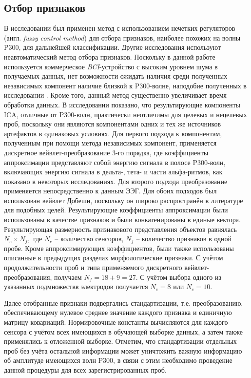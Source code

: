 \documentclass[12pt,a4paper,oneside,fleqn,leqno]{article}
\begin{document}
	\subsection{Отбор признаков}
	\par В исследовании \cite{Piccione} был применен метод с использованием нечетких регуляторов (англ. {\it fuzzy control method}) для отбора признаков, наиболее похожих на волны P300, для дальнейшей классификации. Другие исследования используют неавтоматический метод отбора признаков. Поскольку в данной работе используется коммерческое {\it BCI}-устройство с высоким уровнем шума в получаемых данных, нет возможности ожидать наличия среди полученных независимых компонент наличие близкой к P300-волне, наподобие полученных в исследовании \cite{Piccione}. Кроме того, данный метод существенно увеличивает время обработки данных. В исследовании \cite{James} показано, что результирующие компоненты ICA, отличные от P300-волн, практически неотличимы для целевых и нецелевых проб, поскольку они являются компонентами одних и тех же источников артефактов в одинаковых условиях. Для первого подхода к компонентам, полученным при помощи метода независимых компонент, применяется дискретное вейвлет-преобразование 3-го порядка, где коэффициенты аппроксимации представляют собой  энергию сигнала в полосе P300-волн, включающих энергию сигнала в дельта-, тета- и части альфа-ритмов, как показано в некоторых исследованиях. Для второго подхода преобразование применяется непосредственно к данным ЭЭГ. Для обоих подходов был использован вейвлет Добеши, поскольку он широко распространён в литературе для подобных целей. Результирующие коэффициенты аппроксимации были использованы в качестве признаков и были конкатенированы в единые вектора. Результирующая размерность признакового представления объектов равнялась $N_e \times N_f,$ где $N_e$ -- количество сенсоров, $N_f$ -- количество признаков в одной пробе. Кроме аппроксимирующих коэффициентов, были также использованы описанные в предыдущих разделах морфологические признаки. С учётом продолжительности проб и типа применяемого дискретного вейвлет-преобразования, получаем $N_f = 18 + 9 = 27.$ С учётом выбора одного из указанных подмножествв электродов получается $N_e = 8$ или $N_e = 10.$
	\par Далее отобранные признаки подвергались стандартизации, т.е. преобразованию, обеспечивающему нулевое среднее значение каждого признака и единичную матрицу ковариаций. Нормировочные константы вычисляются для каждого сенсора с учётом всех имеющихся в обучающей выборке данных, а затем также применялись к отложенной выборке. Отметим, что стандартизации отдельных проб без учёта остальной информации может уничтожить важную информацию об амплитуде имеющихся волн P300, в связи с этим необходимо проведение данной процедуры для всех зарегистрированных проб.
\end{document}
